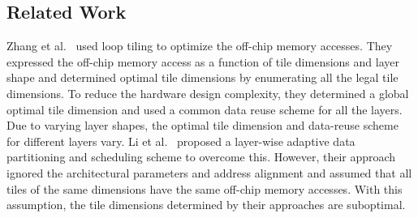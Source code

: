\documentclass[a4paper,10pt]{article}
\begin{document}
\subsection{Related Work}
Zhang et al.~\cite{zhang2015optimizing} used loop tiling to optimize the off-chip memory accesses. They expressed the off-chip memory access as a function of tile dimensions and layer shape and determined optimal tile dimensions by enumerating all the legal tile dimensions. To reduce the hardware design complexity, they determined a global optimal tile dimension and used a common data reuse scheme for all the layers. Due to varying layer shapes, the optimal tile dimension and data-reuse scheme for different layers vary. Li et al.~\cite{Li2018SmartShuttleOO} proposed a layer-wise adaptive data partitioning and scheduling scheme to overcome this. However, their approach ignored the architectural parameters and address alignment and assumed that all tiles of the same dimensions have the same off-chip memory accesses. With this assumption, the tile dimensions determined by their approaches are suboptimal.
\end{document}
